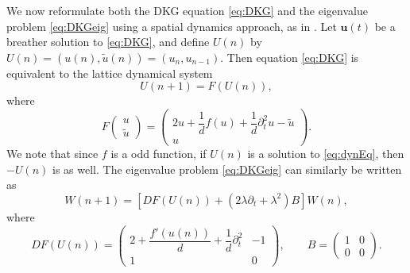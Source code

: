\documentclass[12pt,reqno]{amsart}
\newcommand{\uvec}{\mathbf{u}}
\begin{document}
We now reformulate both the DKG equation \cref{eq:DKG} and the eigenvalue problem \cref{eq:DKGeig} using a spatial dynamics approach, as in \cites{Parker2020,Parker2021}. Let $\uvec(t)$ be a breather solution to \cref{eq:DKG}, and define $U(n)$ by $U(n) = (u(n), \tilde{u}(n)) = ( u_n, u_{n-1} )$. Then equation \cref{eq:DKG} is equivalent to the lattice dynamical system
\begin{equation}\label{eq:dynEq}
U(n+1) = F(U(n)),
\end{equation}
where
\begin{equation}\label{eq:F}
F\begin{pmatrix}u \\ \tilde{u} \end{pmatrix} = 
\begin{pmatrix}2u  + \dfrac{1}{d}f(u) + \dfrac{1}{d} \partial_t^2 u - \tilde{u} \\
u
\end{pmatrix}.
\end{equation}
We note that since $f$ is a odd function, if $U(n)$ is a solution to \cref{eq:dynEq}, then $-U(n)$ is as well. The eigenvalue problem \cref{eq:DKGeig} can similarly be written as 
\begin{equation}\label{eq:dynEVP}
W(n+1) = \left[ DF(U(n)) + (2 \lambda \partial_t + \lambda^2) B \right] W(n),
\end{equation}
where
\begin{equation}\label{eq:DF0}
DF(U(n)) = \begin{pmatrix}
2 + \dfrac{f'(u(n))}{d} + \dfrac{1}{d}\partial_t^2  & -1 \\ 1 & 0
\end{pmatrix}, \qquad
B = \begin{pmatrix} 1 & 0 \\ 0 & 0 \end{pmatrix}.
\end{equation}
\end{document}
